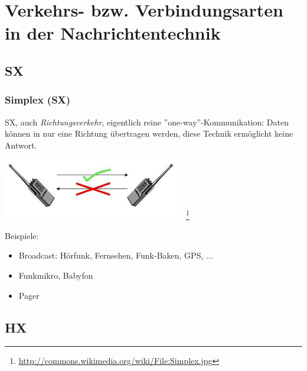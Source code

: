 \section[Verkehrsarten]{Verkehrs- bzw. Verbindungsarten in der Nachrichtentechnik}

\subsection{SX}

\begin{frame}
    \frametitle{Simplex (SX)}

    SX, auch \emph{Richtungsverkehr}, eigentlich reine ''one-way''-Kommunikation: Daten
    können in nur eine Richtung übertragen werden, diese Technik ermöglicht
    keine Antwort.

    \begin{center}
        \includegraphics[width=0.6\textwidth]{bv11/Simplex.jpg}
        \footnote{\tiny \url{http://commons.wikimedia.org/wiki/File:Simplex.jpg}}
    \end{center}

    Beispiele:

    \begin{itemize}
        \item Broadcast: Hörfunk, Fernsehen, Funk-Baken, GPS, ...
        \item Funkmikro, Babyfon
        \item Pager
    \end{itemize}

\end{frame}

\subsection{HX}

